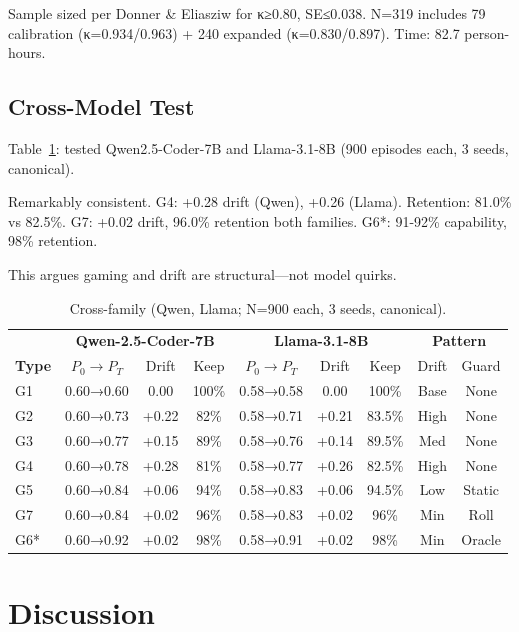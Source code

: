 \documentclass[conference]{IEEEtran}
\begin{document}
Sample sized per Donner \& Eliasziw for κ≥0.80, SE≤0.038. N=319 includes 79 calibration (κ=0.934/0.963) + 240 expanded (κ=0.830/0.897). Time: 82.7 person-hours.

\subsection{Cross-Model Test}

Table~\ref{tab:cross_family_comparison}: tested Qwen2.5-Coder-7B and Llama-3.1-8B (900 episodes each, 3 seeds, canonical).

Remarkably consistent. G4: +0.28 drift (Qwen), +0.26 (Llama). Retention: 81.0\% vs 82.5\%. G7: +0.02 drift, 96.0\% retention both families. G6*: 91-92\% capability, 98\% retention.

This argues gaming and drift are structural—not model quirks.

\begin{table}[t]
\centering
\small
\caption{Cross-family (Qwen, Llama; N=900 each, 3 seeds, canonical).}
\label{tab:cross_family_comparison}
\begin{tabular}{l|ccc|ccc|cc}
\toprule
 & \multicolumn{3}{c|}{\textbf{Qwen-2.5-Coder-7B}} & \multicolumn{3}{c|}{\textbf{Llama-3.1-8B}} & \multicolumn{2}{c}{\textbf{Pattern}} \\
\textbf{Type} & $P_0→P_T$ & Drift & Keep & $P_0→P_T$ & Drift & Keep & Drift & Guard \\
\midrule
G1 & 0.60→0.60 & 0.00 & 100\% & 0.58→0.58 & 0.00 & 100\% & Base & None \\
G2 & 0.60→0.73 & +0.22 & 82\% & 0.58→0.71 & +0.21 & 83.5\% & High & None \\
G3 & 0.60→0.77 & +0.15 & 89\% & 0.58→0.76 & +0.14 & 89.5\% & Med & None \\
G4 & 0.60→0.78 & +0.28 & 81\% & 0.58→0.77 & +0.26 & 82.5\% & High & None \\
G5 & 0.60→0.84 & +0.06 & 94\% & 0.58→0.83 & +0.06 & 94.5\% & Low & Static \\
G7 & 0.60→0.84 & +0.02 & 96\% & 0.58→0.83 & +0.02 & 96\% & Min & Roll \\
G6* & 0.60→0.92 & +0.02 & 98\% & 0.58→0.91 & +0.02 & 98\% & Min & Oracle \\
\bottomrule
\end{tabular}
\end{table}

\section{Discussion}
\end{document}
